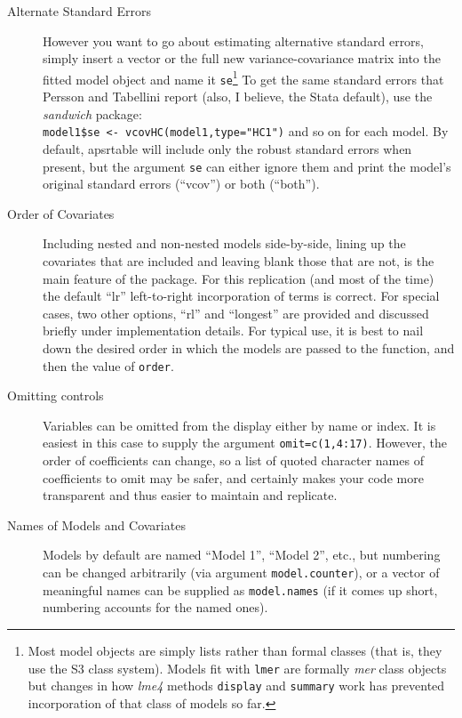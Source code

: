 \documentclass[10pt]{article} %
\begin{document}
\begin{description}
\item[Alternate Standard Errors] However you want to go about estimating alternative standard errors, simply insert a vector or the full new variance-covariance matrix into the fitted model object and name it \texttt{se}\footnote{Most model objects are simply lists rather than formal classes (that is, they use the S3 class system). Models fit with \texttt{lmer} are formally \textit{mer} class objects but changes in how \textit{lme4} methods \texttt{display} and \texttt{summary} work has prevented incorporation of that class of models so far.} To get the same standard errors that Persson and Tabellini report (also, I believe, the Stata default), use the \textit{sandwich} package:\\ \verb|model1$se <- vcovHC(model1,type="HC1")| and so on for each model. By default, apsrtable will include only the robust standard errors when present, but the argument \texttt{se} can either ignore them and print the model's original standard errors (``vcov'') or both (``both'').
\item[Order of Covariates] Including nested and non-nested models side-by-side, lining up the covariates that are included and leaving blank those that are not, is the main feature of the package. For this replication (and most of the time) the default ``lr'' left-to-right incorporation of terms is correct. For special cases, two other options, ``rl'' and ``longest'' are provided and discussed briefly under implementation details. For typical use, it is best to nail down the desired order in which the models are passed to the function, and then the value of \verb|order|.
\item[Omitting controls] Variables can be omitted from the display either by name or index. It is easiest in this case to supply the argument \verb|omit=c(1,4:17)|. However, the order of coefficients can change, so a list of quoted character names of coefficients to omit may be safer, and certainly makes your code more transparent and thus easier to maintain and replicate.
\item[Names of Models and Covariates] Models by default are named ``Model 1'', ``Model 2'', etc., but numbering can be changed arbitrarily (via argument \verb|model.counter|), or a vector of meaningful names can be supplied as \verb|model.names| (if it comes up short, numbering accounts for the named ones).


\end{description}
\end{document}
